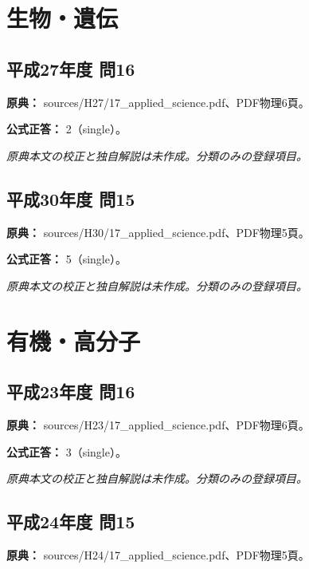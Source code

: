 \section{生物・遺伝}

\subsection{平成27年度 問16}
\label{q:h27-reg-applied-16}

\noindent\textbf{原典：} sources/H27/17\_applied\_science.pdf、PDF物理6頁。

\textbf{公式正答：} 2（single）。

\par\textit{原典本文の校正と独自解説は未作成。分類のみの登録項目。}

\subsection{平成30年度 問15}
\label{q:h30-reg-applied-15}

\noindent\textbf{原典：} sources/H30/17\_applied\_science.pdf、PDF物理5頁。

\textbf{公式正答：} 5（single）。

\par\textit{原典本文の校正と独自解説は未作成。分類のみの登録項目。}

\section{有機・高分子}

\subsection{平成23年度 問16}
\label{q:h23-reg-applied-16}

\noindent\textbf{原典：} sources/H23/17\_applied\_science.pdf、PDF物理6頁。

\textbf{公式正答：} 3（single）。

\par\textit{原典本文の校正と独自解説は未作成。分類のみの登録項目。}

\subsection{平成24年度 問15}
\label{q:h24-reg-applied-15}

\noindent\textbf{原典：} sources/H24/17\_applied\_science.pdf、PDF物理5頁。

